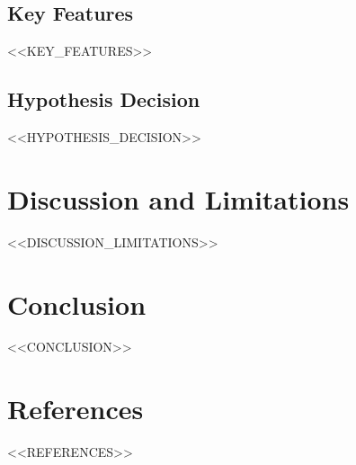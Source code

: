 \documentclass[11pt,a4paper]{article}
\begin{document}
\subsection{Key Features}
<<KEY_FEATURES>>

\subsection{Hypothesis Decision}
<<HYPOTHESIS_DECISION>>

\section{Discussion and Limitations}
<<DISCUSSION_LIMITATIONS>>

\section{Conclusion}
<<CONCLUSION>>

\section*{References}
<<REFERENCES>>
\end{document}
